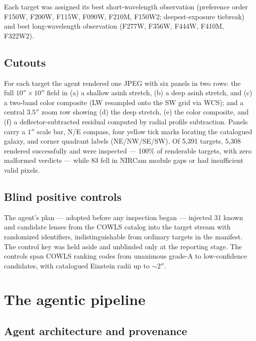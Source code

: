 \documentclass[11pt,letterpaper]{article}
\newcommand{\numtargets}{5{,}391}
\newcommand{\numinspected}{5{,}308}
\begin{document}
Each target was assigned its best short-wavelength observation (preference
order F150W, F200W, F115W, F090W, F210M, F150W2; deepest-exposure tiebreak)
and best long-wavelength observation (F277W, F356W, F444W, F410M, F322W2).

\subsection{Cutouts}\label{sec:cutouts}

For each target the agent rendered one JPEG with six panels in two rows: the
full $10''\times10''$ field in (a) a shallow asinh stretch, (b) a deep asinh
stretch, and (c) a two-band color composite (LW resampled onto the SW grid via
WCS); and a central $3.5''$ zoom row showing (d) the deep stretch, (e) the
color composite, and (f) a deflector-subtracted residual computed by radial
profile subtraction. Panels carry a $1''$ scale bar, N/E compass, four yellow
tick marks locating the catalogued galaxy, and corner quadrant labels
(NE/NW/SE/SW). Of \numtargets{} targets, \numinspected{} rendered successfully
and were inspected --- 100\% of renderable targets, with zero malformed
verdicts --- while 83 fell in NIRCam module gaps or had insufficient valid
pixels.

\subsection{Blind positive controls}\label{sec:controls}

The agent's plan --- adopted before any inspection began --- injected 31
known and candidate lenses from the COWLS catalog
\citep{nightingale2025cowls1,mahler2025cowls2} into the target stream with
randomized identifiers, indistinguishable from ordinary targets in the
manifest. The control key was held aside and unblinded only at the reporting
stage. The controls span COWLS ranking codes from unanimous grade-A to
low-confidence candidates, with catalogued Einstein radii up to
$\sim$$2''$.

\section{The agentic pipeline}\label{sec:pipeline}

\subsection{Agent architecture and provenance}\label{sec:architecture}
\end{document}
